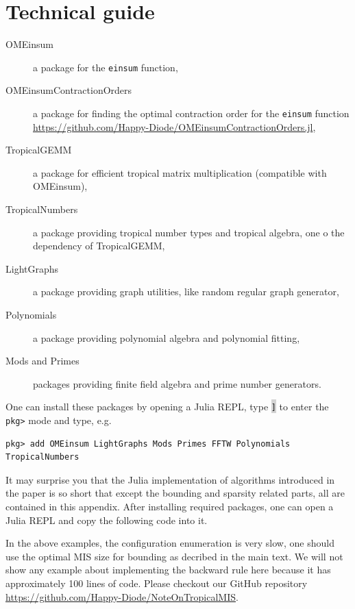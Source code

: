\documentclass[review,onefignum,onetabnum]{siamart190516}
\newcommand{\<}{\langle}
\renewcommand{\>}{\rangle}
\newcounter{example}
\begin{document}
\section{Technical guide}\label{sec:technical}
\begin{description}
	\item[OMEinsum] a package for the \texttt{einsum} function,
	\item[OMEinsumContractionOrders] a package for finding the optimal contraction order for the \texttt{einsum} function \\ \href{https://github.com/Happy-Diode/OMEinsumContractionOrders.jl}{https://github.com/Happy-Diode/OMEinsumContractionOrders.jl},
	\item[TropicalGEMM] a package for efficient tropical matrix multiplication (compatible with OMEinsum),
	\item[TropicalNumbers] a package providing tropical number types and tropical algebra, one o the dependency of TropicalGEMM,
	\item[LightGraphs] a package providing graph utilities, like random regular graph generator,
	\item[Polynomials] a package providing polynomial algebra and polynomial fitting,
	\item[Mods and Primes] packages providing finite field algebra and prime number generators.
\end{description}

One can install these packages by opening a Julia REPL, type \colorbox{lightgray}{\texttt{]}} to enter the \texttt{pkg>} mode and type, e.g.
\begin{lstlisting}
pkg> add OMEinsum LightGraphs Mods Primes FFTW Polynomials TropicalNumbers
\end{lstlisting}

It may surprise you that the Julia implementation of algorithms introduced in the paper is so short that except the bounding and sparsity related parts,
all are contained in this appendix. After installing required packages, one can open a Julia REPL and copy the following code into it.



In the above examples, the configuration enumeration is very slow, one should use the optimal MIS size for bounding as decribed in the main text.
We will not show any example about implementing the backward rule here because it has approximately 100 lines of code.
Please checkout our GitHub repository \href{https://github.com/Happy-Diode/NoteOnTropicalMIS}{https://github.com/Happy-Diode/NoteOnTropicalMIS}.
\end{document}
